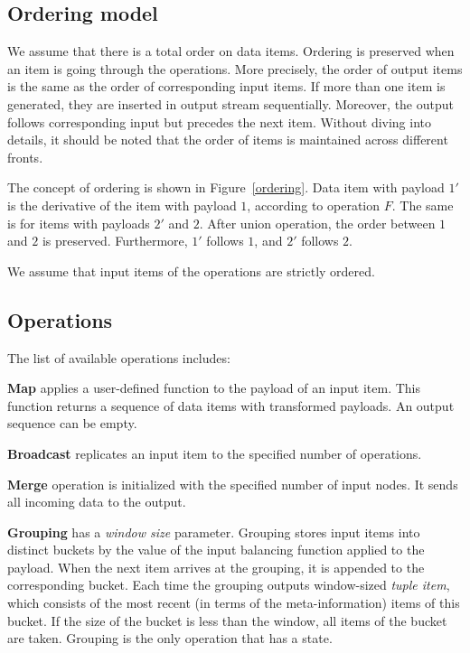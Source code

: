 
\subsection{Ordering model}

We assume that there is a total order on data items. Ordering is preserved when an item is going through the operations. More precisely, the order of output items is the same as the order of corresponding input items. If more than one item is generated, they are inserted in output stream sequentially. Moreover, the output follows corresponding input but precedes the next item. Without diving into details, it should be noted that the order of items is maintained across different fronts.

The concept of ordering is shown in Figure~\ref{ordering}. Data item with payload $1'$ is the derivative of the item with payload $1$, according to operation $F$. The same is for items with payloads $2'$ and $2$. After union operation, the order between $1$ and $2$ is preserved. Furthermore, $1'$ follows $1$, and $2'$ follows $2$.  

We assume that input items of the operations are strictly ordered.

\subsection{Operations}

The list of available operations includes:

{\bf Map} applies a user-defined function to the payload of an input item. This function returns a sequence of data items with transformed payloads. An output sequence can be empty.

{\bf Broadcast} replicates an input item to the specified number of operations.

{\bf Merge} operation is initialized with the specified number of input nodes. It sends all incoming data to the output.

{\bf Grouping} has a {\it window size} parameter. Grouping stores input items into distinct buckets by the value of the input balancing function applied to the payload. When the next item arrives at the grouping, it is appended to the corresponding bucket. Each time the grouping outputs window-sized {\it tuple item}, which consists of the most recent (in terms of the meta-information) items of this bucket. If the size of the bucket is less than the window, all items of the bucket are taken. Grouping is the only operation that has a state.

